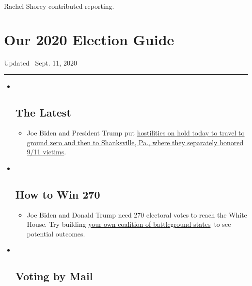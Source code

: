 Rachel Shorey contributed reporting.

\hypertarget{our-2020-election-guide}{%
\section{Our 2020 Election Guide}\label{our-2020-election-guide}}

Updated ~Sept. 11, 2020

\begin{center}\rule{0.5\linewidth}{\linethickness}\end{center}

\begin{itemize}
\item ~
  \hypertarget{the-latest}{%
  \subsection{The Latest}\label{the-latest}}

  \begin{itemize}
  \item
    Joe Biden and President Trump put
    \href{https://www.nytimes3xbfgragh.onion/2020/09/11/us/politics/shanksville-trump-biden.html?action=click\&pgtype=Article\&state=default\&region=BELOW_MAIN_CONTENT\&context=storylines_guide}{hostilities
    on hold today to travel to ground zero and then to Shanksville, Pa.,
    where they separately honored 9/11 victims}.
  \end{itemize}
\item ~
  \hypertarget{how-to-win-270}{%
  \subsection{How to Win 270}\label{how-to-win-270}}

  \begin{itemize}
  \item
    Joe Biden and Donald Trump need 270 electoral votes to reach the
    White House. Try building
    \href{https://www.nytimes3xbfgragh.onion/interactive/2020/us/elections/election-states-biden-trump.html?action=click\&pgtype=Article\&state=default\&region=BELOW_MAIN_CONTENT\&context=storylines_guide}{your
    own coalition of battleground states}~to see potential outcomes.
  \end{itemize}
\item ~
  \hypertarget{voting-by-mail}{%
  \subsection{Voting by Mail}\label{voting-by-mail}}


\end{itemize}
